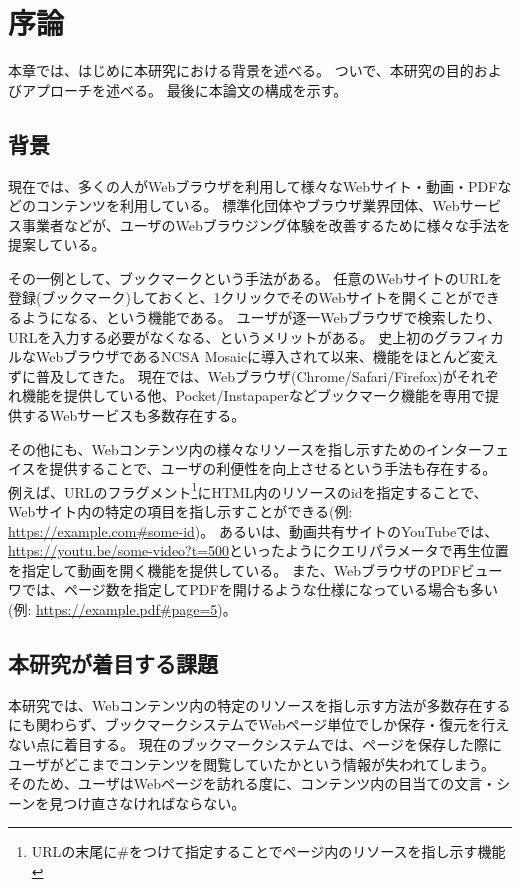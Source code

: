 \chapter{序論}
\label{chap:introduction}

本章では、はじめに本研究における背景を述べる。
ついで、本研究の目的およびアプローチを述べる。
最後に本論文の構成を示す。

\section{背景}
\label{section:background}

現在では、多くの人がWebブラウザを利用して様々なWebサイト・動画・PDFなどのコンテンツを利用している。
標準化団体やブラウザ業界団体、Webサービス事業者などが、ユーザのWebブラウジング体験を改善するために様々な手法を提案している。

その一例として、ブックマークという手法がある。
任意のWebサイトのURLを登録(ブックマーク)しておくと、1クリックでそのWebサイトを開くことができるようになる、という機能である。
ユーザが逐一Webブラウザで検索したり、URLを入力する必要がなくなる、というメリットがある。
史上初のグラフィカルなWebブラウザであるNCSA Mosaic\cite{ncsa-mosaic}に導入されて以来、機能をほとんど変えずに普及してきた。
現在では、Webブラウザ(Chrome\cite{chrome}/Safari\cite{safari}/Firefox\cite{firefox})がそれぞれ機能を提供している他、Pocket\cite{pocket}/Instapaper\cite{instapaper}などブックマーク機能を専用で提供するWebサービスも多数存在する。

その他にも、Webコンテンツ内の様々なリソースを指し示すためのインターフェイスを提供することで、ユーザの利便性を向上させるという手法も存在する。
例えば、URLのフラグメント\footnote{URLの末尾に\#をつけて指定することでページ内のリソースを指し示す機能}にHTML内のリソースのidを指定することで、Webサイト内の特定の項目を指し示すことができる(例: \url{https://example.com#some-id})。
あるいは、動画共有サイトのYouTube\cite{youtube}では、\url{https://youtu.be/some-video?t=500}といったようにクエリパラメータで再生位置を指定して動画を開く機能を提供している。
また、WebブラウザのPDFビューワでは、ページ数を指定してPDFを開けるような仕様になっている場合も多い(例: \url{https://example.pdf#page=5})。

\section{本研究が着目する課題}
本研究では、Webコンテンツ内の特定のリソースを指し示す方法が多数存在するにも関わらず、ブックマークシステムでWebページ単位でしか保存・復元を行えない点に着目する。
現在のブックマークシステムでは、ページを保存した際にユーザがどこまでコンテンツを閲覧していたかという情報が失われてしまう。
そのため、ユーザはWebページを訪れる度に、コンテンツ内の目当ての文言・シーンを見つけ直さなければならない。

